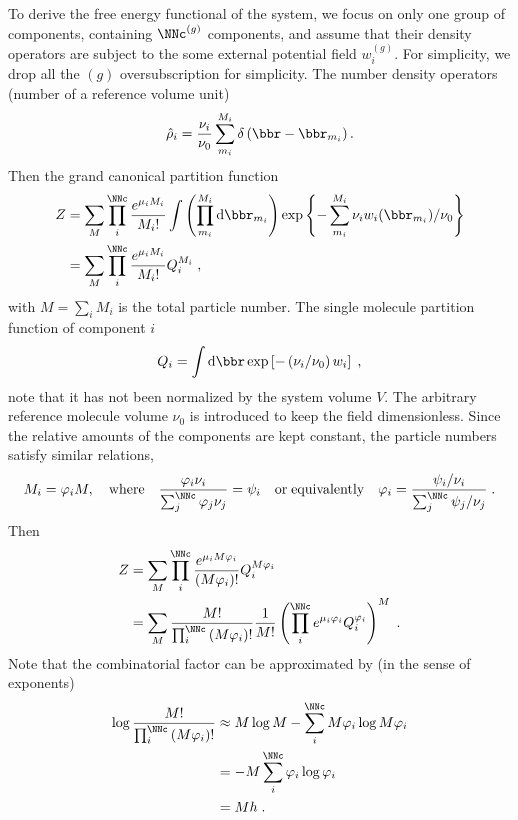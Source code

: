 \documentclass[aps,prl,reprint,onecolumn,groupedaddress,amsmath,amssymb]{revtex4-2}
\newcommand{\dd}{{\mathrm{d}}}
\begin{document}
To derive the free energy functional of the system, we focus on only one group of components, containing $\NNc^{(g)}$ components, and assume that their density operators are subject to the some external potential field $w_i^{(g)}$.
For simplicity, we drop all the $(g)$ oversubscription for simplicity.
The number density operators (number of a reference volume unit)
\begin{align}
    \hat{\rho}_i = \frac{\nu_i}{\nu_0} \sum_{m_i}^{M_i} \delta \left( \bbr - \bbr_{m_i} \right).
\end{align}
Then the grand canonical partition function
\begin{align}
    Z
     & = \sum_{M} \prod_i^{\NNc} \frac{e^{\mu_i M_i}}{M_i !} \int \left( \prod_{m_i}^{M_i} \dd \bbr_{m_i} \right) \exp \left\{ - \sum_{m_i}^{M_i} \nu_i w_i(\bbr_{m_i}) /\nu_0 \right\} \notag \\
     & = \sum_{M} \prod_i^{\NNc} \frac{e^{\mu_i M_i}}{M_i !} Q_i^{M_i} \;,
\end{align}
with $ M = \sum_i M_i$ is the total particle number.
The single molecule partition function of component $i$
\begin{align}
    Q_i = \int \dd \bbr \exp\left[-\left(\nu_i/\nu_0\right) w_i\right] \;,
\end{align}
note that it has not been normalized by the system volume $V$.
The arbitrary reference molecule volume $\nu_0$ is introduced to keep the field dimensionless.
Since the relative amounts of the components are kept constant, the particle numbers satisfy similar relations,
\begin{align}
    M_i = \varphi_i M,  \quad \mathrm{where} \quad \frac{\varphi_i \nu_i}{\sum_j^{\NNc} \varphi_j \nu_j} = \psi_i \quad \mathrm{or \; equivalently} \quad \varphi_i = \frac{\psi_i / \nu_i}{\sum_j^{\NNc} \psi_j / \nu_j} \;.
\end{align}
Then
\begin{align}
    Z
     & = \sum_{M} \prod_i^{\NNc} \frac{e^{\mu_i M \varphi_i}}{\left(M \varphi_i \right) !} Q_i^{M \varphi_i} \notag                                         \\
     & = \sum_{M} \frac{M!}{\prod_i^{\NNc}\left(M \varphi_i \right) !} \frac{1}{M!} \left( \prod_i^{\NNc} e^{\mu_i \varphi_i} Q_i^{\varphi_i} \right)^M \;.
\end{align}
Note that the combinatorial factor can be approximated by (in the sense of exponents)
\begin{align}
    \log \frac{M!}{\prod_i^{\NNc}\left(M \varphi_i \right) !}
     & \approx M \log M - \sum_i^{\NNc} M\varphi_i \log M\varphi_i \notag \\
     & = - M \sum_i^{\NNc} \varphi_i \log \varphi_i \notag                \\
     & = M h \;.
\end{align}
\end{document}

